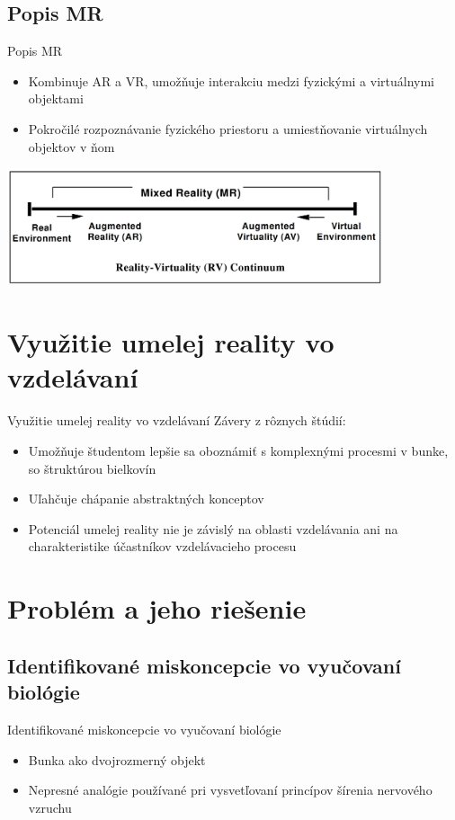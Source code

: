 \documentclass[pdf,aspectratio=169]{beamer}
\begin{document}
\subsection{Popis MR}
\begin{frame}{Popis MR}
    \begin{itemize}
        \item Kombinuje AR a VR, umožňuje interakciu medzi fyzickými a virtuálnymi objektami
        \item Pokročilé rozpoznávanie fyzického priestoru a umiestňovanie virtuálnych objektov v ňom
    \end{itemize}
    \begin{center}
        \includegraphics[width=11cm]{../img/continuum.png}
    \end{center} 
\end{frame}

\section{Využitie umelej reality vo vzdelávaní}
\begin{frame}{Využitie umelej reality vo vzdelávaní}
    Závery z rôznych štúdií:
    \begin{itemize}
        \item Umožňuje študentom lepšie sa oboznámiť s komplexnými procesmi v bunke, so štruktúrou bielkovín
        \item Uľahčuje chápanie abstraktných konceptov
        \item Potenciál umelej reality nie je závislý na oblasti vzdelávania ani na charakteristike účastníkov vzdelávacieho procesu
    \end{itemize}
\end{frame}

\section{Problém a jeho riešenie}
\subsection{Identifikované miskoncepcie vo vyučovaní biológie}
\begin{frame}{Identifikované miskoncepcie vo vyučovaní biológie}
    \begin{itemize}
        \item Bunka ako dvojrozmerný objekt \pause
        \item Nepresné analógie používané pri vysvetľovaní princípov šírenia nervového vzruchu
    \end{itemize}
\end{frame}
\end{document}
